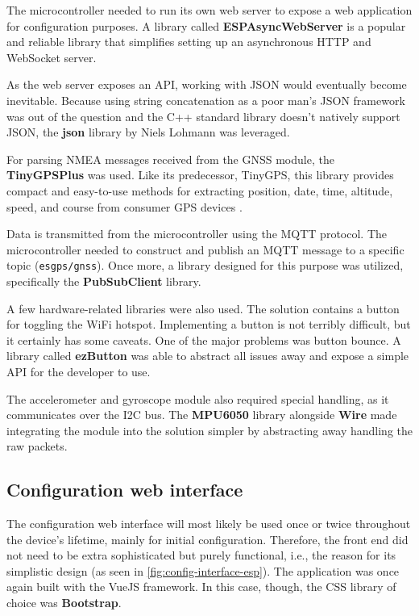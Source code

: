 \documentclass[FM,BP,EN,fonts]{tulthesis}
\begin{document}
The microcontroller needed to run its own web server to expose a web application for configuration purposes. A library called \textbf{ESPAsyncWebServer} is a popular and reliable library that simplifies setting up an asynchronous HTTP and WebSocket server.

As the web server exposes an API, working with JSON would eventually become inevitable. Because using string concatenation as a poor man's JSON framework was out of the question and the C++ standard library doesn't natively support JSON, the \textbf{json} library by Niels Lohmann was leveraged.

For parsing NMEA messages received from the GNSS module, the \textbf{TinyGPSPlus} was used. Like its predecessor, TinyGPS, this library provides compact and easy-to-use methods for extracting position, date, time, altitude, speed, and course from consumer GPS devices \cite{tinygpsplus}.

Data is transmitted from the microcontroller using the MQTT protocol. The microcontroller needed to construct and publish an MQTT message to a specific topic (\verb|esgps/gnss|). Once more, a library designed for this purpose was utilized, specifically the \textbf{PubSubClient} library.

A few hardware-related libraries were also used. The solution contains a button for toggling the WiFi hotspot. Implementing a button is not terribly difficult, but it certainly has some caveats. One of the major problems was button bounce. A library called \textbf{ezButton} was able to abstract all issues away and expose a simple API for the developer to use.

The accelerometer and gyroscope module also required special handling, as it communicates over the I2C bus. The \textbf{MPU6050} library alongside \textbf{Wire} made integrating the module into the solution simpler by abstracting away handling the raw packets.

\subsection{Configuration web interface}
The configuration web interface will most likely be used once or twice throughout the device's lifetime, mainly for initial configuration. Therefore, the front end did not need to be extra sophisticated but purely functional, i.e., the reason for its simplistic design (as seen in \autoref{fig:config-interface-esp}). The application was once again built with the VueJS framework. In this case, though, the CSS library of choice was \textbf{Bootstrap}.
\end{document}
